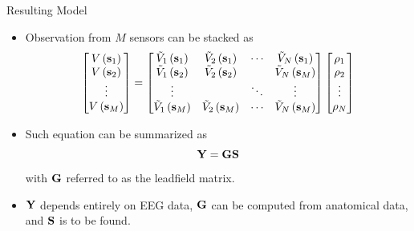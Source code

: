 \documentclass[progressbar=head]{beamer}
\begin{document}
\begin{frame}{Resulting Model}
\begin{itemize}
\item Observation from $M$ sensors can be stacked as
\begin{equation}
\begin{bmatrix}
V\left( \mathbf{s}_1 \right)
\\
V\left( \mathbf{s}_2 \right)
\\
\vdots \\
V\left( \mathbf{s}_M \right)
\end{bmatrix}
=
\begin{bmatrix}
\tilde{V}_1 \left( \mathbf{s}_1 \right) &
\tilde{V}_2 \left( \mathbf{s}_1 \right) &
\cdots &
\tilde{V}_N \left( \mathbf{s}_1 \right) \\
\tilde{V}_1 \left( \mathbf{s}_2 \right) &
\tilde{V}_2 \left( \mathbf{s}_2 \right) &
&
\tilde{V}_N \left( \mathbf{s}_M \right) \\
\vdots &  & \ddots & \vdots \\
\tilde{V}_1 \left( \mathbf{s}_M \right) &
\tilde{V}_2 \left( \mathbf{s}_M \right) &
\cdots &
\tilde{V}_N \left( \mathbf{s}_M \right)
\end{bmatrix}
\begin{bmatrix}
\rho_1 \\ \rho_2 \\ \vdots \\ \rho_N
\end{bmatrix}
\end{equation}
\item Such equation can be summarized as
\begin{equation}
\mathbf{Y} = \mathbf{G} \mathbf{S}
\end{equation}
with $\mathbf{G}$ referred to as the \alert{leadfield matrix}.
\item $\mathbf{Y}$ depends entirely on EEG data, $\mathbf{G}$ can be computed from anatomical data, and $\mathbf{S}$ is to be found.
\end{itemize}
\end{frame}
\end{document}
